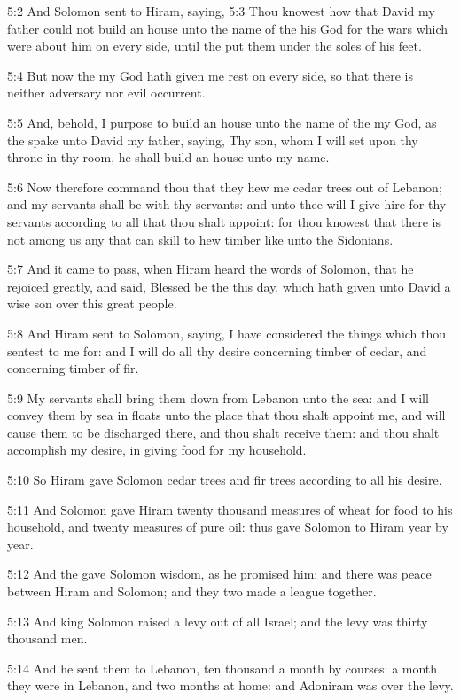 5:2 And Solomon sent to Hiram, saying, 5:3 Thou knowest how that David my father could not build an house unto the name of the \LORD his God for the wars which were about him on every side, until the \LORD put them under the soles of his feet.

5:4 But now the \LORD my God hath given me rest on every side, so that there is neither adversary nor evil occurrent.

5:5 And, behold, I purpose to build an house unto the name of the \LORD my God, as the \LORD spake unto David my father, saying, Thy son, whom I will set upon thy throne in thy room, he shall build an house unto my name.

5:6 Now therefore command thou that they hew me cedar trees out of Lebanon; and my servants shall be with thy servants: and unto thee will I give hire for thy servants according to all that thou shalt appoint: for thou knowest that there is not among us any that can skill to hew timber like unto the Sidonians.

5:7 And it came to pass, when Hiram heard the words of Solomon, that he rejoiced greatly, and said, Blessed be the \LORD this day, which hath given unto David a wise son over this great people.

5:8 And Hiram sent to Solomon, saying, I have considered the things which thou sentest to me for: and I will do all thy desire concerning timber of cedar, and concerning timber of fir.

5:9 My servants shall bring them down from Lebanon unto the sea: and I will convey them by sea in floats unto the place that thou shalt appoint me, and will cause them to be discharged there, and thou shalt receive them: and thou shalt accomplish my desire, in giving food for my household.

5:10 So Hiram gave Solomon cedar trees and fir trees according to all his desire.

5:11 And Solomon gave Hiram twenty thousand measures of wheat for food to his household, and twenty measures of pure oil: thus gave Solomon to Hiram year by year.

5:12 And the \LORD gave Solomon wisdom, as he promised him: and there was peace between Hiram and Solomon; and they two made a league together.

5:13 And king Solomon raised a levy out of all Israel; and the levy was thirty thousand men.

5:14 And he sent them to Lebanon, ten thousand a month by courses: a month they were in Lebanon, and two months at home: and Adoniram was over the levy.


